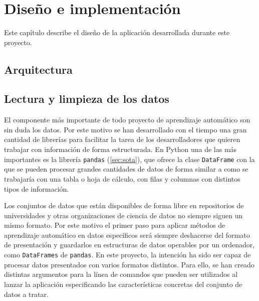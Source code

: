 \chapter{Diseño e implementación}
\label{chap:diseño}

Este capítulo describe el diseño de la aplicación desarrollada durante este proyecto.  


\section{Arquitectura}




\section{Lectura y limpieza de los datos}
\label{sec:limpieza}

El componente más importante de todo proyecto de aprendizaje automático son sin duda los datos. Por este motivo se han desarrollado con el tiempo una gran cantidad de librerías para facilitar la tarea de los desarrolladores que quieren trabajar con información de forma estructurada. En Python una de las más importantes es la librería \texttt{pandas} (\ref{sec:sota}), que ofrece la clase \texttt{DataFrame} con la que se pueden procesar grandes cantidades de datos de forma similar a como se trabajaría con una tabla o hoja de cálculo, con filas y columnas con distintos tipos de información.

Los conjuntos de datos que están disponibles de forma libre en repositorios de universidades y otras organizaciones de ciencia de datos no siempre siguen un mismo formato. Por este motivo el primer paso para aplicar métodos de aprendizaje automático en datos específicos será siempre deshacerse del formato de presentación y guardarlos en estructuras de datos operables por un ordenador, como \texttt{DataFrames} de \texttt{pandas}. En este proyecto, la intención ha sido ser capaz de procesar datos presentados con varios formatos distintos. Para ello, se han creado distintas argumentos para la línea de comandos que pueden ser utilizados al lanzar la aplicación especificando las características concretas del conjunto de datos a tratar.

